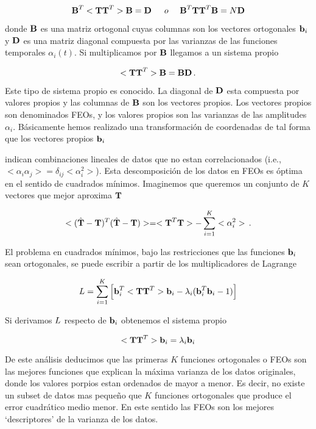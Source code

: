 \documentclass[
]{agujournal2019}
\begin{document}
\[
{\textbf B}^T<{\textbf T}{\textbf T}^T>{\textbf B}={\textbf D}\,\,\,\,\,\,\,\,\,{ o}\,\,\,\,\,\,\,\,{\textbf B}^T{\textbf T}{\textbf T}^T{\textbf B}=N{\textbf D}\]

donde \({\textbf B}\) es una matriz ortogonal cuyas columnas son los
vectores ortogonales \({\textbf b}_i\) y \({\textbf D}\) es una matriz
diagonal compuesta por las varianzas de las funciones temporales
\(\alpha_i(t)\). Si multiplicamos por \({\textbf B}\) llegamos a un
sistema propio

\[
<{\textbf T}{\textbf T}^T>{\textbf B}={\textbf B}{\textbf D}\,.\]

Este tipo de sistema propio es conocido. La diagonal de \({\textbf D}\)
esta compuesta por valores propios y las columnas de \({\textbf B}\) son
los vectores propios. Los vectores propios son denominados FEOs, y los
valores propios son las varianzas de las amplitudes \(\alpha_i\).
Básicamente hemos realizado una transformación de coordenadas de tal
forma que los vectores propios \({\textbf b}_i\)

indican combinaciones lineales de datos que no estan correlacionados
(i.e., \(<\alpha_i \alpha_j>=\delta_{ij}<\alpha^2_i>\)). Esta
descomposición de los datos en FEOs es óptima en el sentido de cuadrados
mínimos. Imaginemos que queremos un conjunto de \(K\) vectores que mejor
aproxima \({\textbf T}\)

\[<(\hat{\textbf T}-{\textbf T})^T(\hat{\textbf T}-{\textbf T})>=<{\textbf T}^T{\textbf T}>
  -\sum\limits^K_{i=1}<\alpha^2_i>\,.\]

El problema en cuadrados mínimos, bajo las restricciones que las
funciones \({\textbf b}_i\) sean ortogonales, se puede escribir a partir
de los multiplicadores de Lagrange

\begin{equation}
{\textbf \cal L}=\sum\limits^K_{i=1}\left[{\textbf b}^T_i<{\textbf T}{\textbf T}^T>{\textbf b}_i-
            \lambda_i({\textbf b}_i^T{\textbf b}_i-1)\right]
\end{equation}

Si derivamos \({\textbf \cal L}\) respecto de \({\textbf b}_i\)
obtenemos el sistema propio

\begin{equation}
<{\textbf T}{\textbf T}^T>{\textbf b}_i=\lambda_i{\textbf b}_i
\end{equation}

De este análisis deducimos que las primeras \(K\) funciones ortogonales
o FEOs son las mejores funciones que explican la máxima varianza de los
datos originales, donde los valores porpios estan ordenados de mayor a
menor. Es decir, no existe un subset de datos mas pequeño que \(K\)
funciones ortogonales que produce el error cuadrático medio menor. En
este sentido las FEOs son los mejores `descriptores' de la varianza de
los datos.
\end{document}
